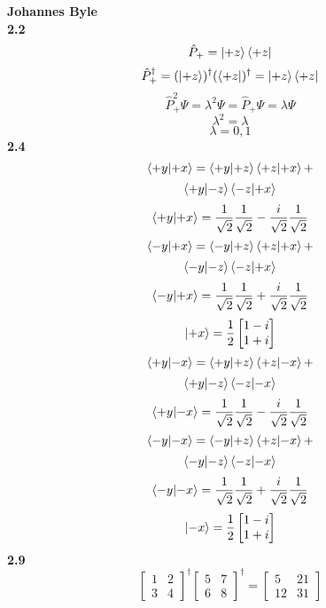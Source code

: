 \documentclass[english]{article}
\begin{document}
\begin{multicols*}{2}
\textbf{Johannes Byle}\\

\noindent
\textbf{2.2}\\
$$\hat{P}_+=\ket{+z}\bra{+z}$$
$$\hat{P}_+^{\dag}=(\ket{+z})^{\dag}(\bra{+z})^{\dag}=\ket{+z}\bra{+z}$$
$$\hat{P}_+^2\Psi=\lambda^2\Psi=\hat{P}_+\Psi=\lambda\Psi$$
$$\lambda^2=\lambda$$
$$\lambda=0,1$$
\noindent
\textbf{2.4}\\
$$\bra{+y}\ket{+x}=\bra{+y}\ket{+z}\bra{+z}\ket{+x}+$$$$\bra{+y}\ket{-z}\bra{-z}\ket{+x}$$
$$\bra{+y}\ket{+x}=\frac{1}{\sqrt{2}}\frac{1}{\sqrt{2}}-\frac{i}{\sqrt{2}}\frac{1}{\sqrt{2}}$$
$$\bra{-y}\ket{+x}=\bra{-y}\ket{+z}\bra{+z}\ket{+x}+$$$$\bra{-y}\ket{-z}\bra{-z}\ket{+x}$$
$$\bra{-y}\ket{+x}=\frac{1}{\sqrt{2}}\frac{1}{\sqrt{2}}+\frac{i}{\sqrt{2}}\frac{1}{\sqrt{2}}$$
\[
\ket{+x}=\frac{1}{2}
\begin{bmatrix}
1-i\\
1+i
\end{bmatrix}
\]
$$\bra{+y}\ket{-x}=\bra{+y}\ket{+z}\bra{+z}\ket{-x}+$$$$\bra{+y}\ket{-z}\bra{-z}\ket{-x}$$
$$\bra{+y}\ket{-x}=\frac{1}{\sqrt{2}}\frac{1}{\sqrt{2}}-\frac{i}{\sqrt{2}}\frac{1}{\sqrt{2}}$$
$$\bra{-y}\ket{-x}=\bra{-y}\ket{+z}\bra{+z}\ket{-x}+$$$$\bra{-y}\ket{-z}\bra{-z}\ket{-x}$$
$$\bra{-y}\ket{-x}=\frac{1}{\sqrt{2}}\frac{1}{\sqrt{2}}+\frac{i}{\sqrt{2}}\frac{1}{\sqrt{2}}$$
\[
\ket{-x}=\frac{1}{2}
\begin{bmatrix}
1-i\\
1+i
\end{bmatrix}
\]
\noindent
\textbf{2.9}\\
\[
\begin{bmatrix}
1&2\\
3&4
\end{bmatrix}
^\dag
\begin{bmatrix}
5&7\\
6&8
\end{bmatrix}
^\dag
=
\begin{bmatrix}
5&21\\
12&31
\end{bmatrix}
\]


\end{multicols*}
\end{document}
